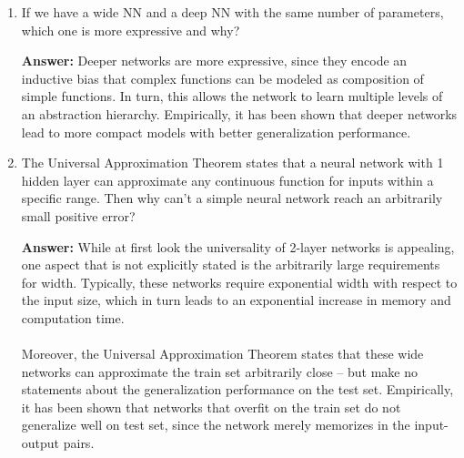 \documentclass{article}
\newenvironment{QandA}{\begin{enumerate}[label=\arabic*.]}{\end{enumerate}}
\newenvironment{answer}{\par\normalfont \textbf{Answer:}}{}
\begin{document}
\begin{QandA}
    \item If we have a wide NN and a deep NN with the same number of parameters, which one is more expressive and why?
    \begin{answer}
        Deeper networks are more expressive, since they encode an inductive bias that complex functions can be modeled as composition of simple functions. In turn, this allows the network to learn multiple levels of an abstraction hierarchy. Empirically, it has been shown that deeper networks lead to more compact models with better generalization performance. 
    \end{answer}

    \item The Universal Approximation Theorem states that a neural network with 1 hidden layer can approximate any continuous function for inputs within a specific range. Then why can’t a simple neural network reach an arbitrarily small positive error?
    \begin{answer}
        While at first look the universality of 2-layer networks is appealing, one aspect that is not explicitly stated is the arbitrarily large requirements for width. Typically, these networks require exponential width with respect to the input size, which in turn leads to an exponential increase in memory and computation time. \\\\
        Moreover, the Universal Approximation Theorem states that these wide networks can approximate the train set arbitrarily close -- but make no statements about the generalization performance on the test set. Empirically, it has been shown that networks that overfit on the train set do not generalize well on test set, since the network merely memorizes in the input-output pairs.
    \end{answer}


\end{QandA}
\end{document}
